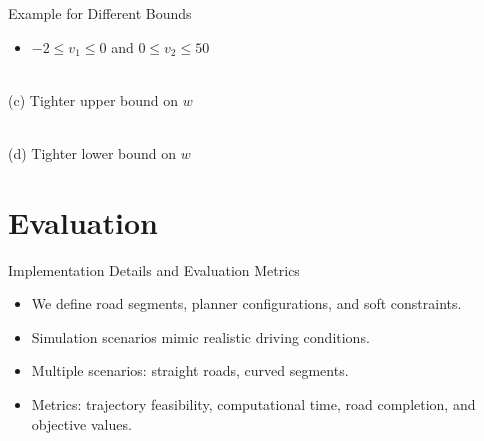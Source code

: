 \documentclass[shortpres,aspectratio=43]{beamer}
\begin{document}
\begin{frame}{Example for Different Bounds}
  \begin{itemize}
    \item $ -2 \leq v_1 \leq 0 $ and $ 0 \leq v_2 \leq 50$
  \end{itemize}
  \centering
  \begin{minipage}[b]{0.45\textwidth}
    \centering
    \resizebox{\textwidth}{!}{}\\
    \small (c) Tighter upper bound on $w$
  \end{minipage}
  \hfill
  \begin{minipage}[b]{0.45\textwidth}
    \centering
    \resizebox{\textwidth}{!}{}\\
    \small (d) Tighter lower bound on $w$
  \end{minipage}

\end{frame}

\section{Evaluation}

\begin{frame}{Implementation Details and Evaluation Metrics}
  \begin{itemize}
    \item We define road segments, planner configurations, and soft constraints.
    \item Simulation scenarios mimic realistic driving conditions.
    \item Multiple scenarios: straight roads, curved segments.
    \item Metrics: trajectory feasibility, computational time, road completion, and objective values.
  \end{itemize}
\end{frame}
\end{document}
